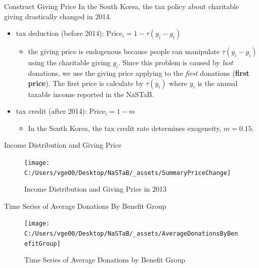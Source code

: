 \documentclass[
  ignorenonframetext,
]{beamer}
\providecommand{\tightlist}{%
  \setlength{\itemsep}{0pt}\setlength{\parskip}{0pt}}
\begin{document}
\begin{frame}{Construct Giving Price}
\protect\hypertarget{construct-giving-price}{}
In the South Korea, the tax policy about charitable giving drastically
changed in 2014.

\begin{itemize}
\tightlist
\item
  tax deduction (before 2014): \(\text{Price}_i = 1 - \tau(y_i - g_i)\)

  \begin{itemize}
  \tightlist
  \item
    the giving price is endogenous because people can manipulate
    \(\tau(y_i - g_i)\) using the charitable giving \(g_i\). Since this
    problem is caused by \emph{last} donations, we use the giving price
    applying to the \emph{first} donations (\textbf{first price}). The
    first price is calculate by \(\tau(y_i)\) where \(y_i\) is the
    annual taxable income reported in the NaSTaB.
  \end{itemize}
\item
  tax credit (after 2014): \(\text{Price}_i = 1 - m\)

  \begin{itemize}
  \tightlist
  \item
    In the South Korea, the tax credit rate determines exogeneity,
    \(m = 0.15\).
  \end{itemize}
\end{itemize}
\end{frame}

\begin{frame}{Income Distribution and Giving Price}
\protect\hypertarget{income-distribution-and-giving-price}{}
\begin{figure}
\texttt{[image: C:/Users/vge00/Desktop/NaSTaB/\_assets/SummaryPriceChange]} \caption{Income Distribution and Giving Price in 2013}\label{fig:unnamed-chunk-2}
\end{figure}
\end{frame}

\begin{frame}{Time Series of Average Donations By Benefit Group}
\protect\hypertarget{time-series-of-average-donations-by-benefit-group}{}
\begin{figure}
\texttt{[image: C:/Users/vge00/Desktop/NaSTaB/\_assets/AverageDonationsByBenefitGroup]} \caption{Time Series of Average Donations by Benefit Group}\label{fig:unnamed-chunk-3}
\end{figure}
\end{frame}
\end{document}
